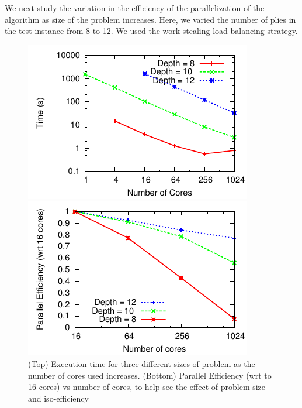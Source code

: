 \documentclass[10pt, conference, compsocconf]{IEEEtran}
\begin{document}
We next study the variation in the efficiency of the parallelization of the
algorithm as size of the problem increases.  Here, we varied the number
of plies in the test instance from 8 to 12. We used the work stealing
load-balancing strategy.  
\begin{figure}[ht] 
\centering
\begin{minipage}{0.7\linewidth}
\includegraphics[width=\columnwidth]{plots/3depths.pdf}
\end{minipage}
\centering
\begin{minipage}{0.7\linewidth}
\includegraphics[width=\columnwidth]{plots/3depthspe.pdf}
\end{minipage}
\caption{(Top) Execution time for three different sizes of problem as the number of cores used increases.
(Bottom) Parallel Efficiency (wrt to 16 cores) vs number of cores, to help see the effect of problem size and iso-efficiency}
\label{3depths}
\vspace{-0.3in}
\end{figure}
\end{document}

